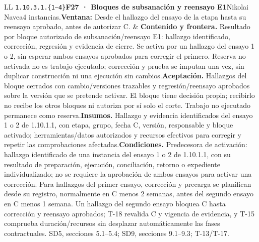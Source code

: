 \begin{longtable}{L{\tabcolsep\relax}L{\tabcolsep\relax}}
\texttt{1.\allowbreak{}10.\allowbreak{}3.\allowbreak{}1.\allowbreak{}\{1--4\}}\newline{}\textbf{F27 · Bloques de subsanación y reensayo E1}\newline{}Nikolai Navea\newline{}4 instancias.\newline{}\textbf{Ventana:} Desde el hallazgo del ensayo de la etapa hasta su reensayo aprobado, antes de autorizar C. & \textbf{Contenido y frontera.} Resultado por bloque autorizado de subsanación/reensayo E1: hallazgo identificado, corrección, regresión y evidencia de cierre. Se activa por un hallazgo del ensayo 1 o 2, sin esperar ambos ensayos aprobados para corregir el primero. Reserva no activada no es trabajo ejecutado; corrección y prueba se imputan una vez, sin duplicar construcción ni una ejecución sin cambios.\newline{}\textbf{Aceptación.} Hallazgos del bloque cerrados con cambio/versiones trazables y regresión/reensayo aprobados sobre la versión que se pretende activar. El bloque tiene decisión propia; recibirlo no recibe los otros bloques ni autoriza por sí solo el corte. Trabajo no ejecutado permanece como reserva.\newline{}\textbf{Insumos.} Hallazgo y evidencia identificados del ensayo 1 o 2 de 1.10.1.1, con etapa, grupo, fecha C, versión, responsable y bloque activado; herramientas/datos autorizados y recursos efectivos para corregir y repetir las comprobaciones afectadas.\newline{}\textbf{Condiciones.} Predecesora de activación: hallazgo identificado de una instancia del ensayo 1 o 2 de 1.10.1.1, con su resultado de preparación, ejecución, conciliación, retorno o expediente individualizado; no se requiere la aprobación de ambos ensayos para activar una corrección. Para hallazgos del primer ensayo, corrección y precarga se planifican desde su registro, normalmente en C menos 2 semanas, antes del segundo ensayo en C menos 1 semana. Un hallazgo del segundo ensayo bloquea C hasta corrección y reensayo aprobados; T-18 revalida C y vigencia de evidencia, y T-15 comprueba duración/recursos sin desplazar automáticamente las fases contractuales. SD5, secciones 5.1--5.4; SD9, secciones 9.1--9.3; T-13/T-17.\\\hline

\end{longtable}

